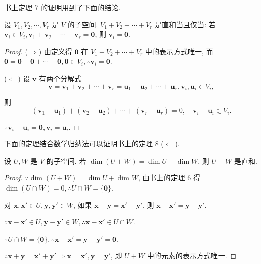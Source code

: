 \documentclass[color=black,device=normal,lang=cn,mode=geye]{elegantnote}
\begin{document}
书上定理 7 的证明用到了下面的结论.
\begin{theorem}
    设 $V_1,V_2,\cdots,V_r$ 是 $V$ 的子空间. $V_1+V_2+\cdots+V_r$ 是直和当且仅当: 若 $\boldsymbol{v}_i\in V_i,\boldsymbol{v}_1+\boldsymbol{v}_2+\cdots+\boldsymbol{v}_r=\boldsymbol{0}$, 则 $\boldsymbol{v}_i=\boldsymbol{0}$.
\end{theorem}
\begin{proof}
    ($\Rightarrow$) 由定义得 $\boldsymbol{0}$ 在 $V_1+V_2+\cdots+V_r$ 中的表示方式唯一, 而 $\boldsymbol{0}=\boldsymbol{0}+\boldsymbol{0}+\cdots+\boldsymbol{0},\boldsymbol{0}\in V_i,\therefore\boldsymbol{v}_i=\boldsymbol{0}$.

    ($\Leftarrow$) 设 $\boldsymbol{v}$ 有两个分解式
    \[\boldsymbol{v}=\boldsymbol{v}_1+\boldsymbol{v}_2+\cdots+\boldsymbol{v}_r=\boldsymbol{u}_1+\boldsymbol{u}_2+\cdots+\boldsymbol{u}_r,\boldsymbol{v}_i,\boldsymbol{u}_i\in V_i,\]

    则
    \[(\boldsymbol{v}_1-\boldsymbol{u}_1)+(\boldsymbol{v}_2-\boldsymbol{u}_2)+\cdots+(\boldsymbol{v}_r-\boldsymbol{u}_r)=0,\quad\boldsymbol{v}_i-\boldsymbol{u}_i\in V_i.\]

    $\therefore\boldsymbol{v}_i-\boldsymbol{u}_i=\boldsymbol{0},\boldsymbol{v}_i=\boldsymbol{u}_i$.
\end{proof}
下面的定理结合数学归纳法可以证明书上的定理 8 ($\Leftarrow$).
\begin{theorem}\label{t1.4}
    设 $U,W$ 是 $V$ 的子空间. 若 $\dim(U+W)=\dim U+\dim W$, 则 $U+W$ 是直和.
\end{theorem}
\begin{proof}
    $\because\dim(U+W)=\dim U+\dim W$, 由书上的定理 6 得 $\dim(U\cap W)=0,\therefore U\cap W=\{\boldsymbol{0}\}$.

    对 $\boldsymbol{x},\boldsymbol{x}'\in U,\boldsymbol{y},\boldsymbol{y}'\in W$, 如果 $\boldsymbol{x}+\boldsymbol{y}=\boldsymbol{x}'+\boldsymbol{y}'$, 则 $\boldsymbol{x}-\boldsymbol{x}'=\boldsymbol{y}-\boldsymbol{y}'$.

    $\because\boldsymbol{x}-\boldsymbol{x}'\in U,\boldsymbol{y}-\boldsymbol{y}'\in W,\therefore\boldsymbol{x}-\boldsymbol{x}'\in U\cap W$.

    $\because U\cap W=\{\boldsymbol{0}\},\therefore\boldsymbol{x}-\boldsymbol{x}'=\boldsymbol{y}-\boldsymbol{y}'=\boldsymbol{0}$.

    $\therefore\boldsymbol{x}+\boldsymbol{y}=\boldsymbol{x}'+\boldsymbol{y}'\Rightarrow\boldsymbol{x}=\boldsymbol{x}',\boldsymbol{y}=\boldsymbol{y}'$, 即 $U+W$ 中的元素的表示方式唯一.
\end{proof}
\end{document}
